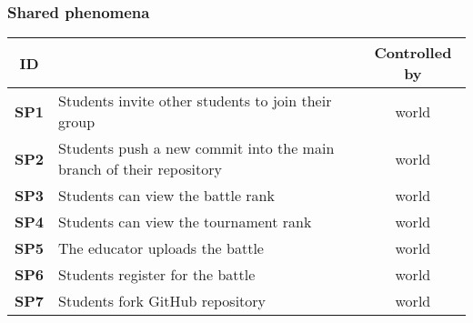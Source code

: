 \subsubsection{Shared phenomena}
\begin{table}[H]
    \centering
    \begin{tabularx}{\textwidth}{c|X|c}
        \toprule
        ID            &                                                                                                                                                                       & Controlled by \\ \midrule
        \textbf{SP1}  & Students invite other students to join their group                                                                                                            & world         \\ \midrule
        \textbf{SP2}  & Students push a new commit into the main branch of their repository                                                                                                                 & world         \\ \midrule
        \textbf{SP3}  & Students can view the battle rank                                                                                                                      & world         \\ \midrule
        \textbf{SP4}  & Students can view the tournament rank                                                                                                                      & world         \\ \midrule
        \textbf{SP5}  & The educator uploads the battle                                                                                           & world       \\ \midrule
        \textbf{SP6}  & Students register for the battle                                                                                                                                      & world         \\ \midrule
        \textbf{SP7}  & Students fork GitHub repository  & world       \\ \midrule


\end{tabularx}
\end{table}
